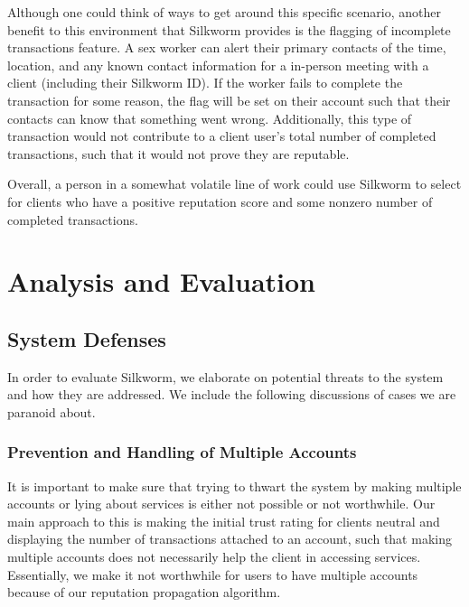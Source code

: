 \documentclass[letterpaper,twocolumn,10pt]{article}
\begin{document}
Although one could think of ways to get around this specific scenario, another benefit to this environment that Silkworm provides is the flagging of incomplete transactions feature. A sex worker can alert their primary contacts of the time, location, and any known contact information for a in-person meeting with a client (including their Silkworm ID). If the worker fails to complete the transaction for some reason, the flag will be set on their account such that their contacts can know that something went wrong. Additionally, this type of transaction would not contribute to a client user's total number of completed transactions, such that it would not prove they are reputable.

Overall, a person in a somewhat volatile line of work could use Silkworm to select for clients who have a positive reputation score and some nonzero number of completed transactions.


\section{Analysis and Evaluation}
\subsection{System Defenses}
In order to evaluate Silkworm, we elaborate on potential threats to the system and how they are addressed. We include the following discussions of cases we are paranoid about. 

\subsubsection{Prevention and Handling of Multiple Accounts}

It is important to make sure that trying to thwart the system by making multiple accounts or lying about services is either not possible or not worthwhile. Our main approach to this is making the initial trust rating for clients neutral and displaying the number of transactions attached to an account, such that making multiple accounts does not necessarily help the client in accessing services. Essentially, we make it not worthwhile for users to have multiple accounts because of our reputation propagation algorithm. 
\end{document}
